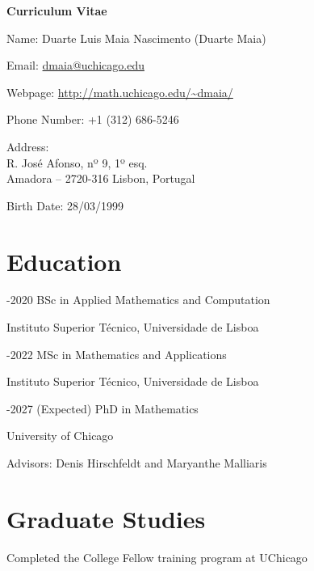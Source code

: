\documentclass[11pt]{article} %
\begin{document}

{\LARGE\bfseries Curriculum Vitae} %
\bigskip %

Name: Duarte Luis Maia Nascimento (Duarte Maia)
\smallskip

Email: \href{mailto:dmaia@uchicago.edu}{dmaia@uchicago.edu} %
\smallskip

Webpage: \url{http://math.uchicago.edu/~dmaia/}

\smallskip

Phone Number: +1 (312) 686-5246 %
\smallskip


Address:\\
R. José Afonso, nº 9, 1º esq.\\ %
Amadora -- 2720-316
Lisbon, Portugal
\smallskip

Birth Date: 28/03/1999 %



\section*{Education}

-2020 BSc in Applied Mathematics and Computation
\smallskip

Instituto Superior Técnico, Universidade de Lisboa

\medskip

-2022 MSc in Mathematics and Applications
\smallskip

Instituto Superior Técnico, Universidade de Lisboa

\medskip

-2027 (Expected) PhD in Mathematics
\smallskip

University of Chicago

Advisors: Denis Hirschfeldt and Maryanthe Malliaris

\section*{Graduate Studies}

 \entry Completed the College Fellow training program at UChicago
\end{document}
